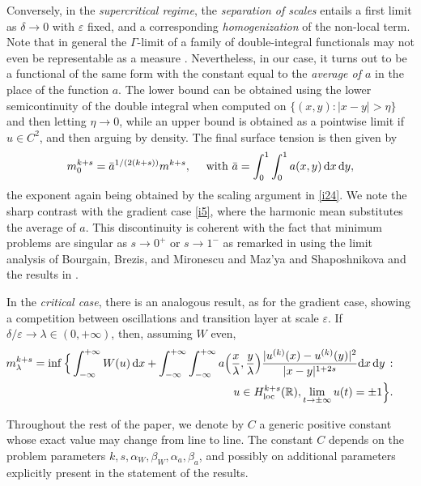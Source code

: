 \documentclass{article}
\theoremstyle{definition}
\newcommand{\de}{\mathrm{d}}
\newcommand{\e}{\varepsilon}
\def\e{\varepsilon}
\begin{document}
Conversely, in the {\em supercritical regime}, the {\em separation of scales} entails a first limit as $\delta\to 0$ with $\e$ fixed, and a corresponding {\em homogenization} of the non-local term. 
Note that in general the $\Gamma$-limit of a family of double-integral functionals may not even be representable as a measure \cite{MR4690560, MR4201441, Mora_Corral-Tellini}. 
Nevertheless, in our case, it turns out to be a functional of the same form with the constant equal to the {\em average of $a$} in the place of the function $a$. 
The lower bound can be obtained using the lower semicontinuity of the double integral when computed on $\{(x,y): |x-y|>\eta\}$ and then letting $\eta\to 0$, while an upper bound is obtained as a pointwise limit if $u\in C^2$, and then arguing by density. The final surface tension is then given by
\begin{equation*}
m^{k+s}_0= \bar a^{1/(2(k+s))}m^{k+s}, \quad\hbox{ with } \bar a=\int_0^1\int_0^1 a(x,y)\,\de x\, \de y,
\end{equation*}
the exponent again being obtained by the scaling argument in \eqref{i24}.
We note the sharp contrast with the gradient case \eqref{i5}, where the harmonic mean substitutes the average of $a$. This discontinuity is coherent with the fact that minimum problems are singular as $s\to 0^+$ or $s\to 1^-$ as remarked in \cite{Solci_2024} using the limit analysis of Bourgain, Brezis, and Mironescu \cite{Bourgain_Brezis_Mironescu} and Maz'ya and Shaposhnikova \cite{M-Sh} and the results in \cite{Bru_Don_Sol_24}.


In the {\em critical case}, there is an analogous result, as for the gradient case, showing a competition between oscillations and transition layer at scale $\e$. 
If $\delta/\e\to\lambda\in(0,+\infty)$, then, assuming $W$ even, 
\begin{eqnarray*}\nonumber
&&\hskip-1cm m^{k+s}_\lambda= \inf\Big\{\int_{-\infty}^{+\infty}W(u)\,\de x+\int_{-\infty}^{+\infty}\int_{-\infty}^{+\infty}a\Big(\frac x\lambda,\frac y\lambda\Big)\frac{|u^{(k)}(x)-u^{(k)}(y)|^2}{|x-y|^{1+2s}}\de x\,\de y\, :\\
&&\hskip6cm\, u\in H^{k+s}_{\rm loc}(\mathbb R), \lim_{t\to \pm \infty} u(t)=\pm1
\Big\}.\nonumber
\end{eqnarray*}


Throughout the rest of the paper, we denote by $C$ a generic positive constant whose exact value may change from line to line. The constant $C$ depends on the problem parameters $k,s, \alpha_W,\beta_W,\alpha_a, \beta_a$, and possibly on additional parameters explicitly present in the statement of the results. 
\end{document}
